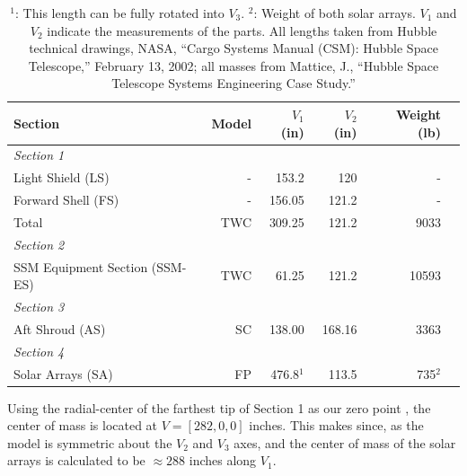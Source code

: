 \documentclass[onecolumn,10pt]{jhwhw}
\begin{document}
\begin{table}[h!]
\begin{center}
\begin{tabular}{l r r r r r}
\toprule
Section & Model & $V_1$ (in) & $V_2$ (in) & Weight (lb) \\
\midrule
\it{Section 1} & & & & \\
\hspace{1em} Light Shield (LS)   & - & 153.2  & 120  & - \\
\hspace{1em} Forward Shell (FS)  & - & 156.05 & 121.2 & - \\
\hspace{1em} Total  & TWC & 309.25 & 121.2 & 9033 \\
\it{Section 2} & & & & \\
\hspace{1em} SSM Equipment Section (SSM-ES) & TWC &  61.25  &  121.2 & 10593\\
\it{Section 3} & & & & \\
\hspace{1em} Aft Shroud (AS) & SC &  138.00  &  168.16 & 3363\\
\it{Section 4} & & & & \\
\hspace{1em} Solar Arrays (SA) & FP &  476.8$^1$  &  113.5 & 735$^2$\\
\bottomrule
\end{tabular}
\end{center}
\caption{$^1$: This length can be fully rotated into $V_3$. $^2$: Weight of both solar arrays. $V_1$ and $V_2$ indicate the measurements of the parts. All lengths taken from Hubble technical drawings,  NASA, ``Cargo Systems Manual (CSM): Hubble Space Telescope,'' February 13, 2002; all masses from Mattice, J., ``Hubble Space Telescope Systems Engineering Case Study.''}
\label{properties}
\end{table}

\clearpage
{}

Using the radial-center of the farthest tip of Section 1 as our zero point , the center of mass is located at $V = [282, 0, 0]$ inches. This makes since, as the model is symmetric about the $V_2$ and $V_3$ axes, and the center of mass of the solar arrays is calculated to be $\approx 288$ inches along $V_1$.
\end{document}

